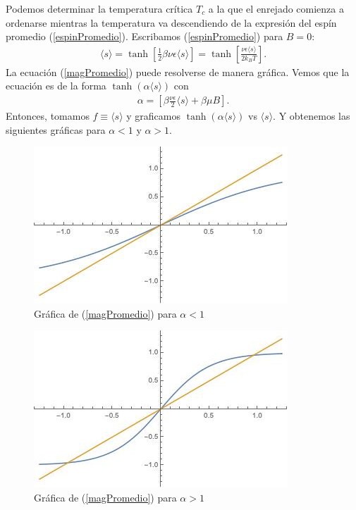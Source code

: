 \documentclass[letterpaper,12pt,oneside]{book}
\begin{document}
%
Podemos determinar la temperatura cr\'itica $T_c$ a la que el enrejado comienza a ordenarse mientras la temperatura va descendiendo de la expresi\'on del esp\'in promedio (\ref{espinPromedio}). Escribamos (\ref{espinPromedio}) para $B = 0$:
%
\begin{eqnarray}
\langle s \rangle = \tanh \left[\frac{1}{2} \beta \nu \epsilon \langle s \rangle \right] = \tanh \left[ \frac{\nu \epsilon \langle s \rangle}{2k_B T}\right]. \label{magPromedio}
\end{eqnarray}
% 
La ecuaci\'on (\ref{magPromedio}) puede resolverse de manera gr\'afica. Vemos que la ecuaci\'on es de la forma $\tanh(\alpha \langle s \rangle)$ con
\begin{eqnarray}
\alpha = \left[\beta  \frac{\nu \epsilon}{2}\langle s \rangle + \beta \mu B\right].  
\end{eqnarray}
Entonces, tomamos $f\equiv \langle s \rangle$ y graficamos $\tanh (\alpha \langle s \rangle)$ vs $\langle s \rangle$. Y obtenemos las siguientes gr\'aficas para $\alpha <1 $ y $\alpha > 1$. 
\begin{figure}
\centering
\includegraphics[scale=0.75]{fig/solucion1.jpeg}
\caption{Gr\'afica de (\ref{magPromedio}) para $\alpha < 1$ \label{meanField1}}
\end{figure}
\begin{figure}
\centering
\includegraphics[scale=0.75]{fig/solucion2.jpeg}
\caption{Gr\'afica de (\ref{magPromedio}) para $\alpha > 1$ \label{meanField2}}
\end{figure}
\end{document}
